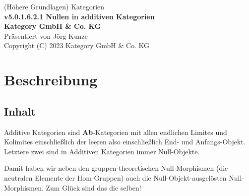 \documentclass[a4paper]{amsart}
\theoremstyle{definition}
\begin{document}
\begin{titlepage}
\centering
{\huge
(Höhere Grundlagen) Kategorien\\[1cm]
\textbf{v5.0.1.6.2.1 Nullen in additiven Kategorien}
}\\[1cm]

\textbf{Kategory GmbH \& Co. KG}\\
Präsentiert von Jörg Kunze\\
Copyright (C) 2023 Kategory GmbH \& Co. KG

\end{titlepage}

%

\newpage

\section*{Beschreibung}

\subsection*{Inhalt}
Additive Kategorien sind \textbf{Ab}-Kategorien mit allen endlichen Limites und Kolimites einschließlich der leeren also einschließlich End- und Anfangs-Objekt. Letztere zwei sind in Additiven Kategorien immer Null-Objekte.

Damit haben wir neben den gruppen-theoretischen Null-Morphismen (die neutralen Elemente der Hom-Gruppen) auch die Null-Objekt-ausgelösten Null-Morphismen. Zum Glück sind das die selben!
\end{document}
